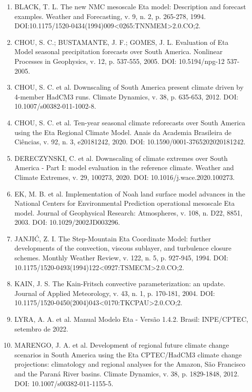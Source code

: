 \documentclass[12pt,a4paper,oneside]{book}
\begin{document}
\begin{enumerate}
\item
  BLACK, T. L. The new NMC mesoscale Eta model: Description and forecast examples. Weather and Forecasting, v. 9, n. 2, p. 265-278, 1994. DOI:10.1175/1520-0434(1994)009\textless0265:TNNMEM\textgreater2.0.CO;2.
\item
  CHOU, S. C.; BUSTAMANTE, J. F.; GOMES, J. L. Evaluation of Eta Model seasonal precipitation forecasts over South America. Nonlinear Processes in Geophysics, v. 12, p. 537-555, 2005. DOI: 10.5194/npg-12 537-2005.
\item
  CHOU, S. C. et al. Downscaling of South America present climate driven by 4-member HadCM3 runs. Climate Dynamics, v. 38, p. 635-653, 2012. DOI: 10.1007/s00382-011-1002-8.
\item
  CHOU, S. C. et al. Ten-year seasonal climate reforecasts over South America using the Eta Regional Climate Model. Anais da Academia Brasileira de Ciências, v. 92, n. 3, e20181242, 2020. DOI: 10.1590/0001-3765202020181242.
\item
  DERECZYNSKI, C. et al. Downscaling of climate extremes over South America - Part I: model evaluation in the reference climate. Weather and Climate Extremes, v. 29, 100273, 2020. DOI: 10.1016/j.wace.2020.100273.
\item
  EK, M. B. et al. Implementation of Noah land surface model advances in the National Centers for Environmental Prediction operational mesoscale Eta model. Journal of Geophysical Research: Atmospheres, v. 108, n. D22, 8851, 2003. DOI: 10.1029/2002JD003296.
\item
  JANJIĆ, Z. I. The Step-Mountain Eta Coordinate Model: further developments of the convection, viscous sublayer, and turbulence closure schemes. Monthly Weather Review, v. 122, n. 5, p. 927-945, 1994. DOI: 10.1175/1520-0493(1994)122\textless0927:TSMECM\textgreater2.0.CO;2.
\item
  KAIN, J. S. The Kain-Fritsch convective parameterization: an update. Journal of Applied Meteorology, v. 43, n. 1, p. 170-181, 2004. DOI: 10.1175/1520-0450(2004)043\textless0170:TKCPAU\textgreater2.0.CO;2.
\item
  LYRA, A. A. et al. Manual Modelo Eta - Versão 1.4.2. Brasil: INPE/CPTEC, setembro de 2022.
\item
  MARENGO, J. A. et al. Development of regional future climate change scenarios in South America using the Eta CPTEC/HadCM3 climate change projections: climatology and regional analyses for the Amazon, São Francisco and the Paraná River basins. Climate Dynamics, v. 38, p. 1829-1848, 2012. DOI: 10.1007/s00382-011-1155-5.

\end{enumerate}
\end{document}
